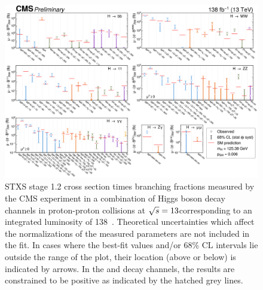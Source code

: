 \begin{landscape}
  \begin{figure}
    \centering
    \includegraphics[width=0.9\pagewidth]{Figures/Theory/Higgs/HIG-21-018-Figure_008.pdf}
    \caption[Measurements of the Stage 1.2 STXS Split by Decay Channel]{STXS stage 1.2 cross section times branching fractions measured by the CMS experiment in a combination of Higgs boson decay channels in proton-proton collisions at $\sqrt{s}=13$\TeV corresponding to an integrated luminosity of 138\fbinv~\cite{CMS-PAS-HIG-21-018}. Theoretical uncertainties which affect the normalizations of the measured parameters are not included in the fit. In cases where the best-fit values and/or 68\% CL intervals lie outside the range of the plot, their location (above or below) is indicated by arrows. In the \Hgg and \HZZ decay channels, the results are constrained to be positive as indicated by the hatched grey lines.}\label{fig:stxs_stage1p2_results_split}
  \end{figure}
\end{landscape}